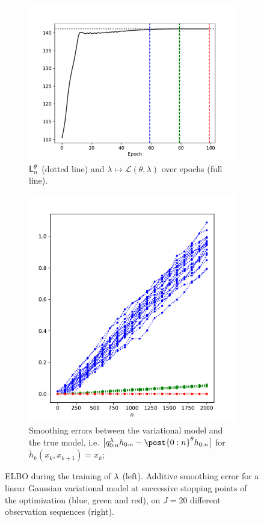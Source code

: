 \documentclass{article}
\begin{document}
\begin{figure}
    \begin{subfigure}{0.5\textwidth}
      \centering
      \includegraphics[width=\linewidth]{./training_curve_linear_gaussian.pdf}
      \caption{$\mathsf{L}_{n}^{\theta}$ (dotted line) and $\lambda \mapsto\mathcal{L}(\theta, \lambda)$ over epochs (full line).}
      \label{fig:linear_gaussian_training_curve}
    \end{subfigure}
    \begin{subfigure}{0.5\textwidth}
      \centering
      \includegraphics[width=\linewidth, height=0.8\textwidth]{./additive_linear_gaussian_2.pdf}
      \caption{Smoothing errors between the variational model and the true model, i.e. $\big| \vd{0:n} h_{0:n} -  \post{0:n}^{\parvec} h_{0:n} \big|$ for $\tilde{h}_{k}(x_k, x_{k+1}) = x_k$;}
      \label{fig:linear_gaussian_additive_error}
    \end{subfigure}

    \caption{ ELBO during the training of $\lambda$ (left).  Additive smoothing error for a linear Gaussian variational model at successive stopping points of the optimization (blue, green and red), on $J=20$ different observation sequences (right).}
    \label{fig:linear_gaussian}
\end{figure}
\end{document}
